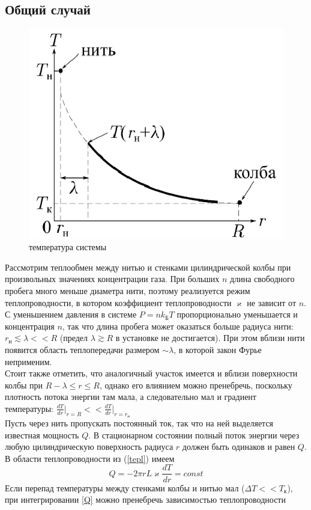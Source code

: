 \documentclass[12pt]{article}
\begin{document}
        \subsection{Общий случай}
        \begin{figure}[H]
            \centering
            \includegraphics[width=0.4\linewidth]{system_tempetatute.png}
            \caption{температура системы}
            \label{fig:temp}
        \end{figure}
        Рассмотрим теплообмен между нитью и стенками цилиндрической колбы при произвольных значениях концентрации газа.
        При больших $n$ длина свободного пробега много меньше диаметра нити, поэтому реализуется режим теплопроводности, в
        котором коэффициент теплопроводности $\varkappa$ не зависит от $n$. С уменьшением давления в
        системе $P = nk_{\text{Б}}T$ пропорционально уменьшается и концентрация $n$, так что длина пробега может оказаться больше
        радиуса нити: $r_{\text{н}} \lesssim \lambda << R$ (предел $\lambda \gtrsim R$ в установке не достигается). При этом вблизи нити появится
        область теплопередачи размером $\sim \lambda$, в которой закон Фурье неприменим.\\
        Стоит также отметить, что аналогичный участок имеется и вблизи поверхности колбы при $R - \lambda \le r \le R$, однако
        его влиянием можно пренебречь, поскольку плотность потока энергии там мала, а следовательно мал и
        градиент температуры: $\frac{dT}{dr}\bigg|_{r=R} << \frac{dT}{dr}\bigg|_{r=r_{\text{н}}} $\\
        Пусть через нить пропускать постоянный ток, так что на ней выделяется известная мощность $Q$. В стационарном состоянии полный поток энергии через
        любую цилиндрическую поверхность радиуса $r$ должен быть одинаков и равен $Q$. В области теплопроводности из (\ref{tepl}) имеем
        \begin{equation}\label{Q}
            Q = -2\pi r L\varkappa \frac{dT}{dr} = const
        \end{equation}
        Если перепад температуры между стенками колбы и нитью мал ($\Delta T << T_{\text{к}}$), при интегрировании \ref{Q} можно пренебречь зависимостью теплопроводности
\end{document}
